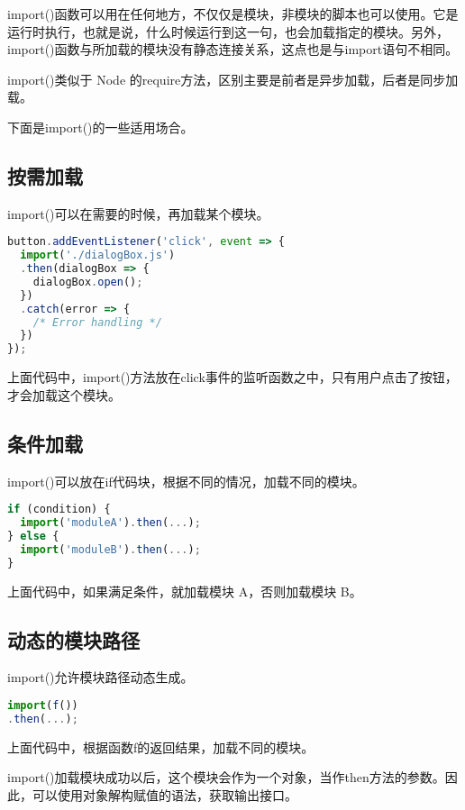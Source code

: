 import()函数可以用在任何地方，不仅仅是模块，非模块的脚本也可以使用。它是运行时执行，也就是说，什么时候运行到这一句，也会加载指定的模块。另外，import()函数与所加载的模块没有静态连接关系，这点也是与import语句不相同。

import()类似于 Node 的require方法，区别主要是前者是异步加载，后者是同步加载。


下面是import()的一些适用场合。

\subsection{按需加载}


import()可以在需要的时候，再加载某个模块。


\begin{lstlisting}[language=JavaScript]
button.addEventListener('click', event => {
  import('./dialogBox.js')
  .then(dialogBox => {
    dialogBox.open();
  })
  .catch(error => {
    /* Error handling */
  })
});
\end{lstlisting}

上面代码中，import()方法放在click事件的监听函数之中，只有用户点击了按钮，才会加载这个模块。

\subsection{条件加载}

import()可以放在if代码块，根据不同的情况，加载不同的模块。



\begin{lstlisting}[language=JavaScript]
if (condition) {
  import('moduleA').then(...);
} else {
  import('moduleB').then(...);
}
\end{lstlisting}

上面代码中，如果满足条件，就加载模块 A，否则加载模块 B。

\subsection{动态的模块路径}

import()允许模块路径动态生成。

\begin{lstlisting}[language=JavaScript]
import(f())
.then(...);
\end{lstlisting}

上面代码中，根据函数f的返回结果，加载不同的模块。

import()加载模块成功以后，这个模块会作为一个对象，当作then方法的参数。因此，可以使用对象解构赋值的语法，获取输出接口。



